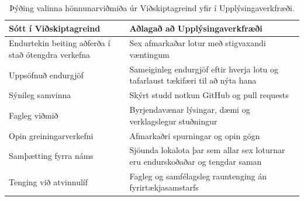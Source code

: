 \begin{table}[b]
\centering
\small
\begin{tabular}{p{}p{}}
\textbf{Sótt í Viðskiptagreind} & \textbf{Aðlagað að Upplýsingaverkfræði} \\
\hline
Endurtekin beiting aðferða í stað ótengdra verkefna & Sex afmarkaðar lotur með stigvaxandi væntingum \\
Uppsöfnuð endurgjöf & Sameiginleg endurgjöf eftir hverja lotu og tafarlaust tækifæri til að nýta hana \\
Sýnileg samvinna & Skýrt studd notkun GitHub og pull requests \\
Fagleg viðmið & Byrjendavænar lýsingar, dæmi og verklagslegur stuðningur \\
Opin greiningarverkefni & Afmarkaðri spurningar og opin gögn \\
Samþætting fyrra náms & Sjöunda lokalota þar sem allar sex loturnar eru endurskoðaðar og tengdar saman \\
Tenging við atvinnulíf & Fagleg og samfélagsleg rauntenging án fyrirtækjasamstarfs \\
\end{tabular}
\caption{Þýðing valinna hönnunarviðmiða úr Viðskiptagreind yfir í Upplýsingaverkfræði.}
\label{tab:bi-ie}
\end{table}
